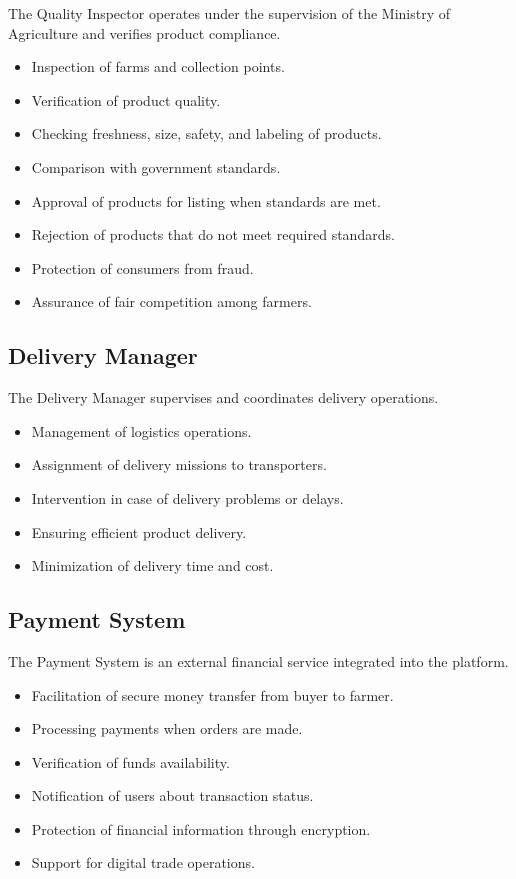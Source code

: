 The Quality Inspector operates under the supervision of the Ministry of Agriculture and verifies product compliance.

\begin{itemize}
	\item Inspection of farms and collection points.
	\item Verification of product quality.
	\item Checking freshness, size, safety, and labeling of products.
	\item Comparison with government standards.
	\item Approval of products for listing when standards are met.
	\item Rejection of products that do not meet required standards.
	\item Protection of consumers from fraud.
	\item Assurance of fair competition among farmers.
\end{itemize}

\subsection{Delivery Manager}

The Delivery Manager supervises and coordinates delivery operations.

\begin{itemize}
	\item Management of logistics operations.
	\item Assignment of delivery missions to transporters.
	\item Intervention in case of delivery problems or delays.
	\item Ensuring efficient product delivery.
	\item Minimization of delivery time and cost.
\end{itemize}

\subsection{Payment System}

The Payment System is an external financial service integrated into the platform.

\begin{itemize}
	\item Facilitation of secure money transfer from buyer to farmer.
	\item Processing payments when orders are made.
	\item Verification of funds availability.
	\item Notification of users about transaction status.
	\item Protection of financial information through encryption.
	\item Support for digital trade operations.
\end{itemize}

